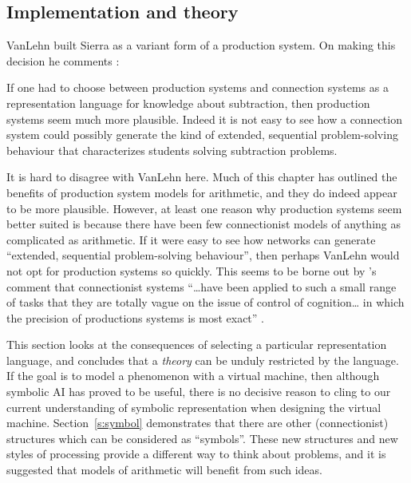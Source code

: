 \subsection{Implementation and theory}

VanLehn built Sierra as a variant form of a production system.  On making
this decision he comments \citeyear[p.~69]{mindbugs}:
\begin{ssquote}
If one had to choose between production systems and
connection systems as a representation language for knowledge
about subtraction, then production systems seem much more
plausible.  Indeed it is not easy to see how a connection system could
possibly generate the kind of extended, sequential problem-solving
behaviour that characterizes students solving subtraction problems.
\end{ssquote}
It is
hard to disagree with VanLehn here.  Much of this chapter has outlined
the benefits of production system models for arithmetic, and they do indeed
appear to be more plausible.
However, at least one reason why production systems
seem better suited is because there have been few
connectionist models of anything as complicated as arithmetic.
If it were
easy to see how networks can generate ``extended, sequential
problem-solving behaviour'', then perhaps VanLehn would not opt for
production systems so quickly.  This seems to be borne out
by \citeauthor{andearch}'s comment that
connectionist systems ``\ldots have been applied to such a small range of
tasks that they are totally vague on the issue of control of cognition\ldots
in which the precision of productions systems is most exact''
\citeyear[note~2, p.~307]{andearch}.

This section looks at the consequences of selecting a particular
representation language, and concludes that a {\em theory} can be unduly
restricted by the language.  If the goal is to model a phenomenon with a
virtual machine, then although symbolic AI has proved to be useful, there
is no decisive reason to cling to our current understanding of symbolic
representation when designing the virtual machine. Section~\ref{s:symbol}
demonstrates that there are other (connectionist) structures which can be
considered as ``symbols''.  These new structures and new styles of
processing provide a different way to think about problems, and it is
suggested that models of arithmetic will benefit from such ideas.

